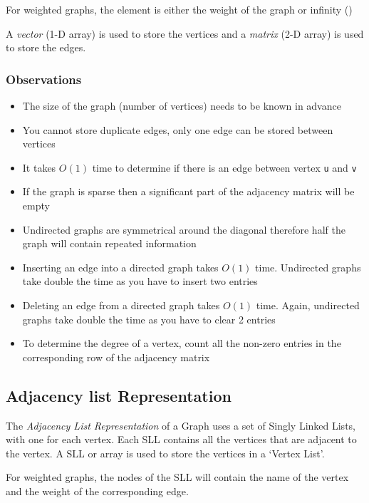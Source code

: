 For weighted graphs, the element is either the weight of the graph or infinity (\infty)


A \textit{vector} (1-D array) is used to store the vertices and a \textit{matrix} (2-D array) is used to store the edges.

\subsubsection{Observations}
\begin{itemize}
    \item The size of the graph (number of vertices) needs to be known in advance
    \item You cannot store duplicate edges, only one edge can be stored between vertices
    \item It takes $O(1)$ time to determine if there is an edge between vertex \verb|u| and \verb|v|
    \item If the graph is sparse then a significant part of the adjacency matrix will be empty
    \item Undirected graphs are symmetrical around the diagonal therefore half the graph will contain repeated information
    \item Inserting an edge into a directed graph takes $O(1)$ time. Undirected graphs take double the time as you have to insert two entries
    \item Deleting an edge from a directed graph takes $O(1)$ time. Again, undirected graphs take double the time as you have to clear 2 entries
    \item To determine the degree of a vertex, count all the non-zero entries in the corresponding row of the adjacency matrix
\end{itemize}

\subsection{Adjacency list Representation}
The \textit{Adjacency List Representation} of a Graph uses a set of Singly Linked Lists, with one for each vertex. Each SLL contains all the vertices that are adjacent to the vertex. A SLL or array is used to store the vertices in a `Vertex List'. 

For weighted graphs, the nodes of the SLL will contain the name of the vertex and the weight of the corresponding edge.

